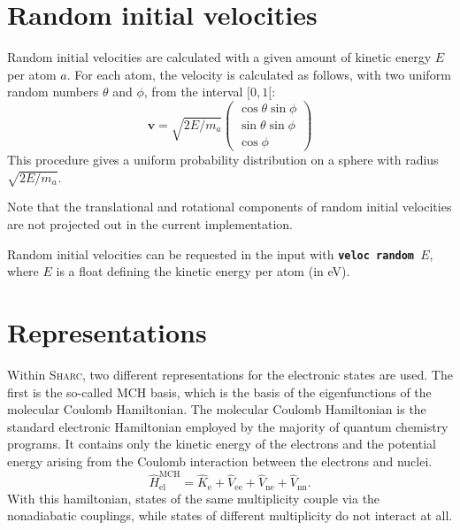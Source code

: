 \documentclass[a4paper,10pt,DIV=15,openany]{scrbook}
\newcommand{\sharc}{\textsc{Sharc}}
\newcommand{\ttt}[1]{\textbf{\texttt{#1}}}
\newcommand{\E}{\ensuremath{\mathrm{e}}}
\newcommand{\VEC}[1]{\ensuremath{\mathbf{#1}}}
\begin{document}

\section{Random initial velocities}\label{met:veloc}

Random initial velocities are calculated with a given amount of kinetic energy $E$ per atom $a$. For each atom, the velocity is calculated as follows, with two uniform random numbers $\theta$ and $\phi$, from the interval $[0,1[$:
\begin{equation}
  \VEC{v}=\sqrt{2E/m_a}
  \begin{pmatrix}
    \cos{\theta}\sin{\phi}\\
    \sin{\theta}\sin{\phi}\\
    \cos{\phi}
  \end{pmatrix}
\end{equation}
This procedure gives a uniform probability distribution on a sphere with radius $\sqrt{2E/m_a}$.

Note that the translational and rotational components of random initial velocities are not projected out in the current implementation.

Random initial velocities can be requested in the input with \ttt{veloc random $E$}, where $E$ is a float defining the kinetic energy per atom (in eV).


\section{Representations}\label{sec:repr}

Within \sharc, two different representations for the electronic states are used. The first is the so-called MCH basis, which is the basis of the eigenfunctions of the molecular Coulomb Hamiltonian. The molecular Coulomb Hamiltonian is the standard electronic Hamiltonian employed by the majority of quantum chemistry programs. It contains only the kinetic energy of the electrons and the potential energy arising from the Coulomb interaction between the electrons and nuclei.
\begin{equation}
  \hat{H}_{\text{el}}^{\text{MCH}}
  =\hat{K}_{\E}
  +\hat{V}_{\text{ee}}
  +\hat{V}_{\text{ne}}
  +\hat{V}_{\text{nn}}.
\end{equation}
With this hamiltonian, states of the same multiplicity couple via the nonadiabatic couplings, while states of different multiplicity do not interact at all. 
\end{document}
